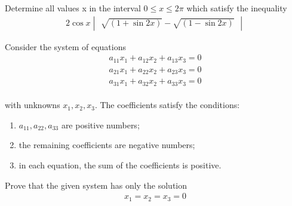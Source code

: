 \item Determine all values x in the interval $0 \leq x \leq 2\pi$ which satisfy the inequality
\begin{align*}
2\cos{x} 
\begin{vmatrix} 
\sqrt{(1+\sin{2x})} - \sqrt{(1-\sin{2x})}
 \end{vmatrix}
\end{align*}
\item Consider the system of equations
\begin{align}
a_{11}x_1 + a_{12}x_2 + a_{13}x_3 = 0\\
a_{21}x_1 + a_{22}x_2 + a_{23}x_3 = 0\\
a_{31}x_1 + a_{32}x_2 + a_{33}x_3 = 0
\end{align}
\\with unknowns $x_1, x_2, x_3.$ The coefficients satisfy the conditions:\\
\begin{enumerate} 
\item $a_{11},a_{22},a_{33}$ are positive numbers;
\item the remaining coefficients are negative numbers;
\item in each equation, the sum of the coefficients is positive.
\end{enumerate}
Prove that the given system has only the solution 
\begin{align*}
x_1 = x_2 = x_3 = 0
\end{align*}
 

